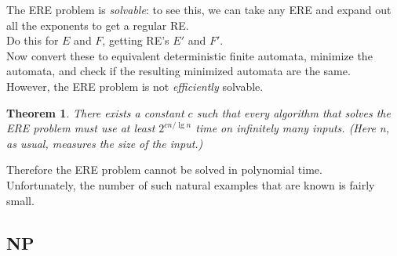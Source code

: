 \documentclass[12pt]{article}
\theoremstyle{plain}
\newtheorem{theorem}{Theorem}[subsection]
\theoremstyle{definition}
\begin{document}
The ERE problem is \emph{solvable}: to see this, we can take any ERE and expand out all the exponents to get a regular RE. \\
Do this for $E$ and $F$, getting RE's $E'$ and $F'$. \\
Now convert these to equivalent deterministic finite automata, minimize the automata, and check if the resulting minimized automata are the same. \\

However, the ERE problem is not \emph{efficiently} solvable.

\begin{theorem}
There exists a constant $c$ such that every algorithm that solves the ERE problem must use at least $2^{cn/\lg{n}}$ time on infinitely many inputs.
(Here n, as usual, measures the size of the input.)
\end{theorem}

Therefore the ERE problem cannot be solved in polynomial time. \\
Unfortunately, the number of such natural examples that are known is fairly small.

\subsection{NP}

\clearpage
\printindex
\end{document}
